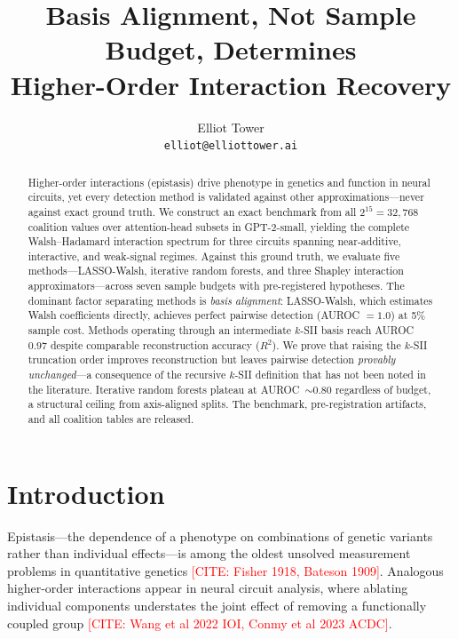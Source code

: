 \documentclass[11pt]{article}
\title{Basis Alignment, Not Sample Budget, Determines\\Higher-Order Interaction Recovery}
\author{
  Elliot Tower \\
  \texttt{elliot@elliottower.ai}
}
\newcommand{\citeneeded}[1]{\textcolor{red}{[CITE: #1]}}
\begin{document}
\maketitle

\begin{abstract}
Higher-order interactions (epistasis) drive phenotype in genetics and
function in neural circuits, yet every detection method is validated
against other approximations---never against exact ground truth.
We construct an exact benchmark from all $2^{15} = 32{,}768$ coalition
values over attention-head subsets in GPT-2-small, yielding the
complete Walsh--Hadamard interaction spectrum for three circuits
spanning near-additive, interactive, and weak-signal regimes.
Against this ground truth, we evaluate five methods---LASSO-Walsh,
iterative random forests, and three Shapley interaction
approximators---across seven sample budgets with pre-registered
hypotheses.
%
The dominant factor separating methods is \emph{basis alignment}:
LASSO-Walsh, which estimates Walsh coefficients directly, achieves
perfect pairwise detection (AUROC $= 1.0$) at 5\% sample cost.
Methods operating through an intermediate $k$-SII basis reach
AUROC~$0.97$ despite comparable reconstruction accuracy ($R^2$).
We prove that raising the $k$-SII truncation order improves
reconstruction but leaves pairwise detection \emph{provably
unchanged}---a consequence of the recursive $k$-SII definition
that has not been noted in the literature. Iterative random forests
plateau at AUROC~$\sim 0.80$ regardless of budget, a structural
ceiling from axis-aligned splits.
The benchmark, pre-registration artifacts, and all coalition tables
are released.
\end{abstract}


\section{Introduction}
\label{sec:intro}

Epistasis---the dependence of a phenotype on combinations of genetic
variants rather than individual effects---is among the oldest unsolved
measurement problems in quantitative genetics
\citeneeded{Fisher 1918, Bateson 1909}.
Analogous higher-order interactions appear in neural circuit analysis,
where ablating individual components understates the joint effect of
removing a functionally coupled group
\citeneeded{Wang et al 2022 IOI, Conmy et al 2023 ACDC}.
\end{document}
